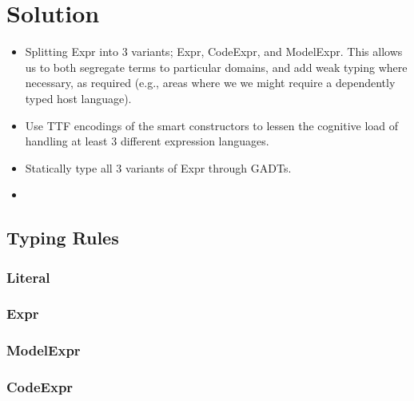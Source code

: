 \section{Solution}

\begin{itemize}
    
    \item Splitting Expr into 3 variants; Expr, CodeExpr, and ModelExpr.
          This allows us to both segregate terms to particular domains, and
          add weak typing where necessary, as required (e.g., areas where we
          we might require a dependently typed host language).
    
    \item Use TTF encodings of the smart constructors to lessen the cognitive load
          of handling at least 3 different expression languages.

    \item Statically type all 3 variants of Expr through GADTs.

    \item {}

\end{itemize}

\subsection{Typing Rules}

\subsubsection{Literal}



\subsubsection{Expr}



\subsubsection{ModelExpr}



\subsubsection{CodeExpr}





